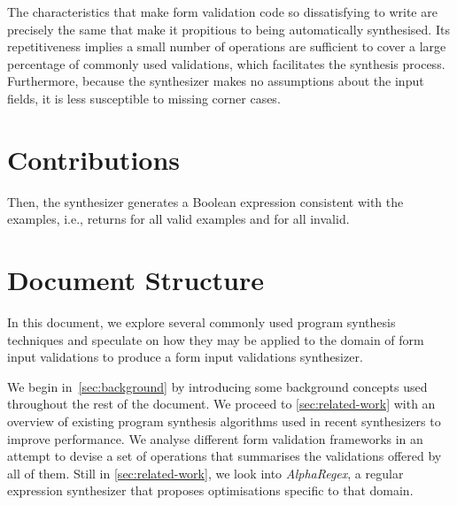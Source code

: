 The characteristics that make form validation code so dissatisfying to write are precisely the same that make it propitious to being automatically synthesised.
Its repetitiveness implies a small number of operations are sufficient to cover a large percentage of commonly used validations, which facilitates the synthesis process.
Furthermore, because the synthesizer makes no assumptions about the input fields, it is less susceptible to missing corner cases.

\section{Contributions}
Then, the synthesizer generates a Boolean expression consistent with the examples, i.e., returns \true{} for all valid examples and \false{} for all invalid.



\section{Document Structure}

In this document, we explore several commonly used program synthesis techniques and speculate on how they may be applied to the domain of form input validations to produce a form input validations synthesizer.

We begin in~\autoref{sec:background} by introducing some background concepts used throughout the rest of the document.
We proceed to \autoref{sec:related-work} with an overview of existing program synthesis algorithms used in recent synthesizers to improve performance.
We analyse different form validation frameworks in an attempt to devise a set of operations that summarises the validations offered by all of them. Still in \autoref{sec:related-work}, we look into \textit{AlphaRegex}, a regular expression synthesizer that proposes optimisations specific to that domain.


